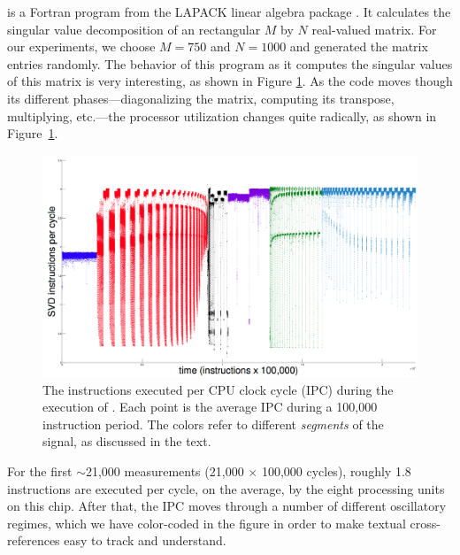 \svd is a Fortran program from the LAPACK linear algebra package
\cite{lapack}.  It calculates the singular value decomposition of an
rectangular $M$ by $N$ real-valued matrix.  For our experiments, we
choose $M=750$ and $N=1000$ and generated the matrix entries randomly.
% 
% 
The behavior of this program as it computes the singular values of
this matrix is very interesting, as shown in Figure
\ref{fig:svd-ts-colored}.  As the code moves though its different
phases---diagonalizing the matrix, computing its transpose,
multiplying, etc.---the processor utilization changes quite radically,
as shown in Figure~\ref{fig:svd-ts-colored}.
\begin{figure}[t]
    \centering
    \includegraphics[width=\columnwidth]{figs/SVD1RegimesColored}
    \caption{The instructions executed per CPU clock cycle (IPC)
      during the execution of \svd. Each point is the average IPC
      during a 100,000 instruction period.  The colors refer to
      different {\sl segments} of the signal, as discussed in the
      text.}
    \label{fig:svd-ts-colored}
  \end{figure}
For the first $\sim$21,000 measurements (21,000 $\times$ 100,000
cycles), roughly 1.8 instructions are executed per cycle, on the
average, by the eight processing units on this chip.  After that, the
IPC moves through a number of different oscillatory regimes, which we
have color-coded in the figure in order to make textual
cross-references easy to track and understand.

